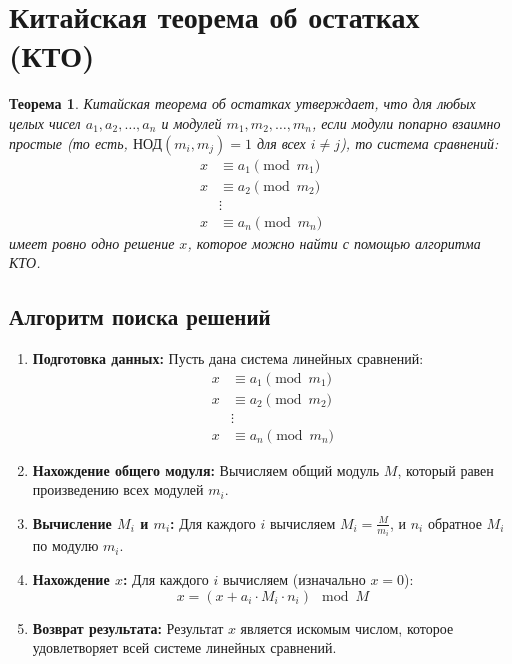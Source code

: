 \documentclass[12pt, a4paper, openany]{book}
\newtheorem*{theorem}{Теорема}
\begin{document}
\section{Китайская теорема об остатках (КТО)}

\begin{theorem}
    Китайская теорема об остатках утверждает, что для любых целых чисел $a_1, a_2, \ldots, a_n$ и модулей $m_1, m_2, \ldots, m_n$, если модули попарно взаимно простые (то есть, $\text{НОД}(m_i, m_j) = 1$ для всех $i \neq j$), то система сравнений:
    \[
    \begin{aligned}
    x &\equiv a_1 \pmod{m_1} \\
    x &\equiv a_2 \pmod{m_2} \\
    &\vdots \\
    x &\equiv a_n \pmod{m_n}
    \end{aligned}
    \]
    имеет ровно одно решение $x$, которое можно найти с помощью алгоритма КТО.
\end{theorem}

\subsection{Алгоритм поиска решений}
\begin{enumerate}
    \item \textbf{Подготовка данных:} Пусть дана система линейных сравнений:
    \[
    \begin{aligned}
    x &\equiv a_1 \pmod{m_1} \\
    x &\equiv a_2 \pmod{m_2} \\
    &\vdots \\
    x &\equiv a_n \pmod{m_n}
    \end{aligned}
    \]
    
    \item \textbf{Нахождение общего модуля:} Вычисляем общий модуль $M$, который равен произведению всех модулей $m_i$.
    
    \item \textbf{Вычисление $M_i$ и $m_i$:} Для каждого $i$ вычисляем $M_i = \frac{M}{m_i}$, и $n_i$ обратное $M_i$ по модулю $m_i$.
    
    \item \textbf{Нахождение $x$:} Для каждого $i$ вычисляем (изначально $x = 0$):
    \[
    x = (x + a_i \cdot M_i \cdot n_i) \mod M
    \]
    
    \item \textbf{Возврат результата:} Результат $x$ является искомым числом, которое удовлетворяет всей системе линейных сравнений.
\end{enumerate}
\end{document}
